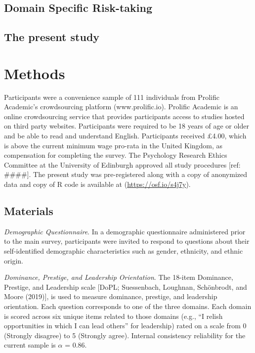 \documentclass[
  english,
  man]{apa6}
\begin{document}
\hypertarget{domain-specific-risk-taking}{%
\subsection{Domain Specific Risk-taking}\label{domain-specific-risk-taking}}

\hypertarget{the-present-study}{%
\subsection{The present study}\label{the-present-study}}

\hypertarget{methods}{%
\section{Methods}\label{methods}}

Participants were a convenience sample of 111 individuals from Prolific Academic's crowdsourcing platform (www.prolific.io). Prolific Academic is an online crowdsourcing service that provides participants access to studies hosted on third party websites. Participants were required to be 18 years of age or older and be able to read and understand English. Participants received £4.00, which is above the current minimum wage pro-rata in the United Kingdom, as compensation for completing the survey. The Psychology Research Ethics Committee at the University of Edinburgh approved all study procedures {[}ref: \#\#\#\#{]}. The present study was pre-registered along with a copy of anonymized data and copy of R code is available at (\url{https://osf.io/s4j7y}).

\hypertarget{materials}{%
\subsection{Materials}\label{materials}}

\emph{Demographic Questionnaire}. In a demographic questionnaire administered prior to the main survey, participants were invited to respond to questions about their self-identified demographic characteristics such as gender, ethnicity, and ethnic origin.

\emph{Dominance, Prestige, and Leadership Orientation}. The 18-item Dominance, Prestige, and Leadership scale {[}DoPL; Suessenbach, Loughnan, Schönbrodt, and Moore (2019){]}, is used to measure dominance, prestige, and leadership orientation. Each question corresponds to one of the three domains. Each domain is scored across six unique items related to those domains (e.g., ``I relish opportunities in which I can lead others'' for leadership) rated on a scale from 0 (Strongly disagree) to 5 (Strongly agree). Internal consistency reliability for the current sample is \(\alpha\) = 0.86.
\end{document}
